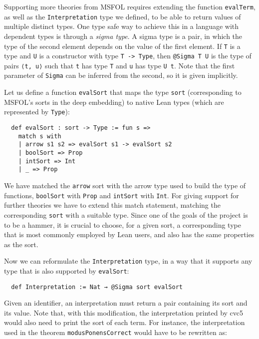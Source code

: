 Supporting more theories from MSFOL requires extending the function \texttt{evalTerm},
as well as the \texttt{Interpretation} type we defined, to be able to return values
of multiple distinct types. One type safe way to achieve this in a language with
dependent types is through a \textit{sigma type}. A sigma type is a pair, in which
the type of the second element depends on the value of the first element. If
\texttt{T} is a type and \texttt{U} is a constructor with type
\texttt{T -> Type}, then \texttt{@Sigma T U} is the type
of pairs \texttt{⟨t, u⟩} such that \texttt{t} has type \texttt{T} and
\texttt{u} has type \texttt{U t}. Note that the first parameter of \texttt{Sigma}
can be inferred from the second, so it is given implicitly.

Let us define a function \texttt{evalSort} that maps the type \texttt{sort}
(corresponding to MSFOL's sorts in the deep embedding) to native Lean types
(which are represented by \texttt{Type}):

\begin{verbatim}
  def evalSort : sort -> Type := fun s =>
    match s with
    | arrow s1 s2 => evalSort s1 -> evalSort s2
    | boolSort => Prop
    | intSort => Int
    | _ => Prop
\end{verbatim}

We have matched the \texttt{arrow} sort with the arrow type used to build the type of
functions, \texttt{boolSort} with \texttt{Prop} and \texttt{intSort} with \texttt{Int}.
For giving support for further theories we have to extend this match statement,
matching the corresponding \texttt{sort} with a suitable type. Since one of the goals
of the project is to be a hammer, it is crucial to choose, for a given sort,
a corresponding type that is most commonly employed by Lean users, and also
has the same properties as the sort.

Now we can reformulate the \texttt{Interpretation} type, in a way that
it supports any type that is also supported by \texttt{evalSort}:

\begin{verbatim}
  def Interpretation := Nat → @Sigma sort evalSort
\end{verbatim}

Given an identifier, an interpretation must return a pair containing its sort
and its value. Note that, with this modification, the interpretation printed
by cvc5 would also need to print the sort of each term. For instance,
the interpretation used in the theorem \texttt{modusPonensCorrect} would have
to be rewritten as:

